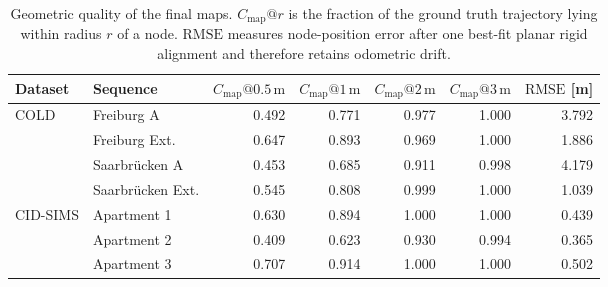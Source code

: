 \documentclass[5p,twocolumn,nonatbib,reversenotenum]{elsarticle}
\begin{document}
\begin{table}[t]
\centering
\caption{Geometric quality of the final maps. $C_{\mathrm{map}}@r$ is the fraction of the ground truth trajectory lying within radius $r$ of a node. $\mathrm{RMSE}$ measures node-position error after one best-fit planar rigid alignment and therefore retains odometric drift.}
\label{tab:mapquality}
\small
\setlength{\tabcolsep}{3.5pt}
\begin{tabular}{llrrrrr}
\hline
Dataset & Sequence & $C_{\mathrm{map}}@0.5\,\mathrm{m}$ & $C_{\mathrm{map}}@1\,\mathrm{m}$ & $C_{\mathrm{map}}@2\,\mathrm{m}$ & $C_{\mathrm{map}}@3\,\mathrm{m}$ & $\mathrm{RMSE}$ [m]\\
\hline
\multirow{4}{*}{COLD} & Freiburg A         & 0.492 & 0.771 & 0.977 & 1.000 & 3.792\\
 & Freiburg Ext.      & 0.647 & 0.893 & 0.969 & 1.000 & 1.886\\
 & Saarbr\"ucken A   & 0.453 & 0.685 & 0.911 & 0.998 & 4.179\\
 & Saarbr\"ucken Ext.& 0.545 & 0.808 & 0.999 & 1.000 & 1.039\\
\hline
\multirow{3}{*}{CID-SIMS} & Apartment 1        & 0.630 & 0.894 & 1.000 & 1.000 & 0.439\\
 & Apartment 2        & 0.409 & 0.623 & 0.930 & 0.994 & 0.365\\
 & Apartment 3        & 0.707 & 0.914 & 1.000 & 1.000 & 0.502\\
\hline
\end{tabular}
\end{table}
\end{document}
